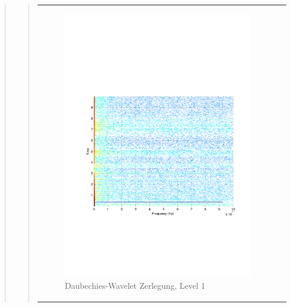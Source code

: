 \begin{quote}
\begin{quote}
\begin{center}
\begin{tabular}{ll}
\begin{minipage}{0.6\textwidth}
                    \end{minipage}
                    \begin{minipage}{0.6\textwidth}
    
                        \begin{figure}[H]
                            \label{fig:}
                            \includegraphics[scale=0.4, trim = 2cm 6cm 1cm
                            7.5cm,
                            clip]{./Bilder/Termin8/fehlerfrei_hochlaufen_Spectrogam.pdf}
                            \caption{Daubechies-Wavelet Zerlegung, Level 1}
                        \end{figure}
                    \vspace{-1.5em}
    
                    \end{minipage}
    

\end{tabular}
\end{center}
\end{quote}
\end{quote}
